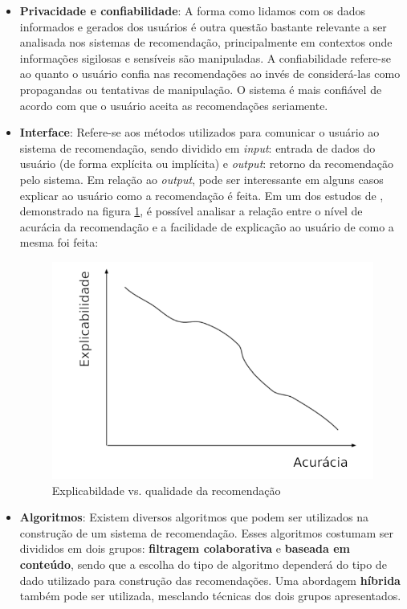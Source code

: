 \begin{itemize}
	\item \textbf{Privacidade e confiabilidade}: A forma como lidamos com os dados informados e gerados dos usuários é outra questão bastante relevante a ser analisada nos sistemas de recomendação, principalmente em contextos onde informações sigilosas e sensíveis são manipuladas. A confiabilidade refere-se ao quanto o usuário confia nas recomendações ao invés de considerá-las como propagandas ou tentativas de manipulação. O sistema é mais confiável de acordo com que o usuário aceita as recomendações seriamente.
	
	\item \textbf{Interface}: Refere-se aos métodos utilizados para comunicar o usuário ao sistema de recomendação, sendo dividido em \textit{input}: entrada de dados do usuário (de forma explícita ou implícita) e \textit{output}: retorno da recomendação pelo sistema. Em relação ao \textit{output}, pode ser interessante em alguns casos explicar ao usuário como a recomendação é feita. Em um dos estudos de , demonstrado na figura \ref{fig:explicabilidade}, é possível analisar a relação entre o nível de acurácia da recomendação e a facilidade de explicação ao usuário de como a mesma foi feita:
	
	\begin{figure}[H]
		\centering
		\includegraphics[width=0.7\linewidth]{imagens/explicabilidade}
		\caption[Explicabildade vs. qualidade da recomendação]{Explicabildade vs. qualidade da recomendação}
		\label{fig:explicabilidade}
	\end{figure}
	 
	\item \textbf{Algoritmos}: Existem diversos algoritmos que podem ser utilizados na construção de um sistema de recomendação. Esses algoritmos costumam ser divididos em dois grupos: \textbf{filtragem colaborativa} e \textbf{baseada em conteúdo}, sendo que a escolha do tipo de algoritmo dependerá do tipo de dado utilizado para construção das recomendações. Uma abordagem \textbf{híbrida} também pode ser utilizada, mesclando técnicas dos dois grupos apresentados.
\end{itemize}

